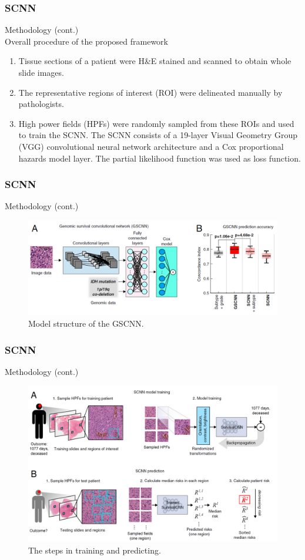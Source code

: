 \documentclass{beamer}
\begin{document}
	\begin{frame}
		\frametitle{SCNN}
		Methodology (cont.)\\
		\vspace{5mm}
		Overall procedure of the proposed framework
		\begin{enumerate}[A]
			\item Tissue sections of a patient were H\&E stained and scanned to obtain whole slide images.
			\item The representative regions of interest (ROI) were delineated manually by pathologists. 
			\item High power fields (HPFs) were randomly sampled from these ROIs and used to train the SCNN. The SCNN consists of a 19-layer Visual Geometry Group (VGG) convolutional neural network architecture and a Cox proportional hazards model layer. The partial likelihood function was used as loss function.
		\end{enumerate}
	\end{frame}
	
	\begin{frame}
		\frametitle{SCNN}
		Methodology (cont.)
		
		\begin{figure}[H]
			\centering
			\includegraphics[scale=0.27]{figures/GSCNN.png}
			\caption{Model structure of the GSCNN.}
			\label{fig:gscnn}
		\end{figure}
	\end{frame}

	\begin{frame}
		\frametitle{SCNN}
		Methodology (cont.)
		
		\begin{figure}[H]
			\centering
			\includegraphics[scale=0.12]{figures/scnn-train-pred.png}
			\caption{The steps in training and predicting.}
			\label{fig:scnn-train-pred}
		\end{figure}
	\end{frame}
	
\end{document}
